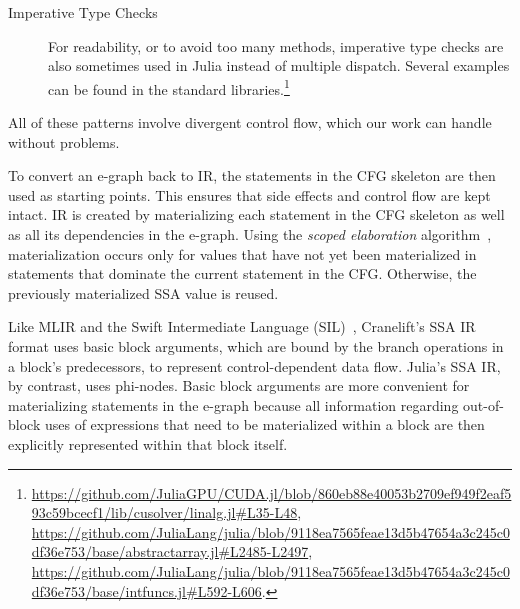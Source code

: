 \begin{description}
\item [Imperative Type Checks] For readability, or to avoid too many methods, imperative type checks are also sometimes used in Julia instead of multiple dispatch. Several examples can be found in the standard libraries.\footnote{\url{https://github.com/JuliaGPU/CUDA.jl/blob/860eb88e40053b2709ef949f2eaf593c59bcecf1/lib/cusolver/linalg.jl\#L35-L48}, \url{https://github.com/JuliaLang/julia/blob/9118ea7565feae13d5b47654a3c245c0df36e753/base/abstractarray.jl\#L2485-L2497}, \url{https://github.com/JuliaLang/julia/blob/9118ea7565feae13d5b47654a3c245c0df36e753/base/intfuncs.jl\#L592-L606}.}
\end{description}

All of these patterns involve divergent control flow, which our work can handle without problems. 



To convert an e-graph back to IR, the statements in the CFG skeleton are then used as starting points. %
This ensures that side effects and control flow are kept intact.
IR is created by materializing each statement in the CFG skeleton as well as all its dependencies in the e-graph.
Using the \emph{scoped elaboration} algorithm~\cite{fallinAegraphsAcyclicEgraphs2023}, materialization occurs only for values that have not yet been materialized in statements that dominate the current statement in the CFG. Otherwise, the previously materialized SSA value is reused.

Like MLIR and the Swift Intermediate Language (SIL)~\cite{swiftSIL,MLIRRationale}, Cranelift's SSA IR format uses basic block arguments, which are bound by the branch operations in a block's predecessors, to represent control-dependent data flow. Julia's SSA IR, by contrast, uses phi-nodes. 
Basic block arguments are more convenient for materializing statements in the e-graph because all information regarding out-of-block uses of expressions that need to be materialized within a block are then explicitly represented within that block itself. 

